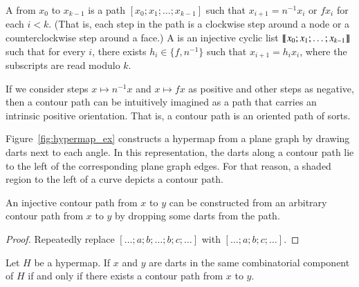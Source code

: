 \begin{definition}
 A  from
$x_0$ to $x_{k-1}$ is a path $[x_0;x_1;\ldots;x_{k-1}]$ such that
$x_{i+1} = n^{-1} x_i$ or $f x_i$ for each $i<k$.  (That is, each
step in the path is a clockwise step around a node or a
counterclockwise step around a face.)  
A  is an injective cyclic list
${\llbracket{x_0;x_1;\ldots;x_{k-1}}\rrbracket}$ such that
for every $i$, there exists $h_i\in \{f,n^{-1}\}$ such that $x_{i+1} = h_i x_i$, 
where the subscripts are
read modulo $k$.
%
%
\end{definition}


If we consider steps $x\mapsto n^{-1} x$ and $x\mapsto f x $ as
positive and other steps as negative, then a contour path can be
intuitively imagined as a path that carries an intrinsic positive
orientation.  That is, a contour path is an oriented path of sorts.



\begin{remark}
 Figure~\ref{fig:hypermap_ex}
  constructs a hypermap from a plane graph by drawing darts next to
  each angle.  In this representation, the darts along a contour path
  lie to the left of the corresponding plane graph edges.  For that
  reason, a shaded region to the left of a curve depicts a contour
  path.
\end{remark}

\figTUPLKAJ %


\begin{lemma} 
An injective contour path from
  $x$ to $y$ can be constructed from an arbitrary contour path from
  $x$ to $y$ by dropping some darts from the path.
\end{lemma}

\begin{proof} Repeatedly replace $[\ldots;a;b;\ldots;b;c;\ldots]$ with
$[\ldots;a;b;c;\ldots]$.
\end{proof}





\begin{lemma}\label{lemma:connect-contour}  
Let $H$ be a hypermap.
If $x$ and $y$ are darts in the same combinatorial component of $H$ if and only if
there exists a contour path from $x$ to $y$.
\end{lemma}

